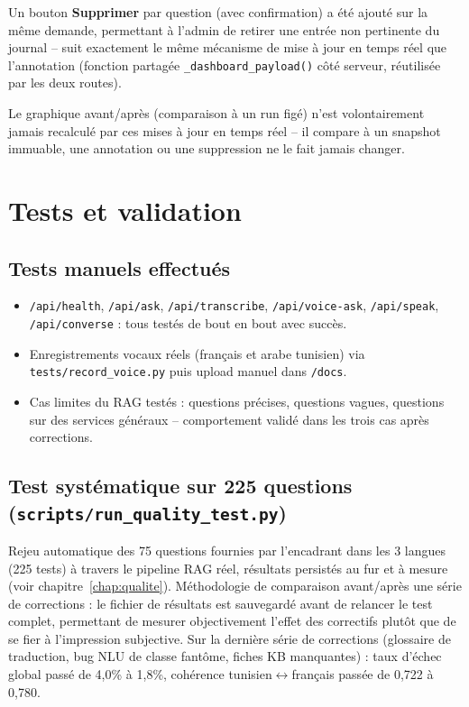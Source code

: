 \documentclass[11pt,a4paper]{report}
\begin{document}
Un bouton \textbf{Supprimer} par question (avec confirmation) a été ajouté sur la même
demande, permettant à l'admin de retirer une entrée non pertinente du journal -- suit
exactement le même mécanisme de mise à jour en temps réel que l'annotation (fonction
partagée \texttt{\_dashboard\_payload()} côté serveur, réutilisée par les deux routes).

\begin{noteinfo}
Le graphique avant/après (comparaison à un run figé) n'est volontairement jamais
recalculé par ces mises à jour en temps réel -- il compare à un snapshot immuable, une
annotation ou une suppression ne le fait jamais changer.
\end{noteinfo}

\chapter{Tests et validation}

\section{Tests manuels effectués}
\begin{itemize}
    \item \texttt{/api/health}, \texttt{/api/ask}, \texttt{/api/transcribe},
    \texttt{/api/voice-ask}, \texttt{/api/speak}, \texttt{/api/converse} : tous testés de
    bout en bout avec succès.
    \item Enregistrements vocaux réels (français et arabe tunisien) via
    \texttt{tests/record\_voice.py} puis upload manuel dans \texttt{/docs}.
    \item Cas limites du RAG testés : questions précises, questions vagues, questions sur
    des services généraux -- comportement validé dans les trois cas après corrections.
\end{itemize}

\section{Test systématique sur 225 questions (\texttt{scripts/run\_quality\_test.py})}
Rejeu automatique des 75 questions fournies par l'encadrant dans les 3 langues (225 tests)
à travers le pipeline RAG réel, résultats persistés au fur et à mesure (voir
chapitre~\ref{chap:qualite}). Méthodologie de comparaison avant/après une série de
corrections : le fichier de résultats est sauvegardé avant de relancer le test complet,
permettant de mesurer objectivement l'effet des correctifs plutôt que de se fier à
l'impression subjective. Sur la dernière série de corrections (glossaire de traduction,
bug NLU de classe fantôme, fiches KB manquantes) : taux d'échec global passé de 4{,}0\% à
1{,}8\%, cohérence tunisien$\leftrightarrow$français passée de 0{,}722 à 0{,}780.
\end{document}
